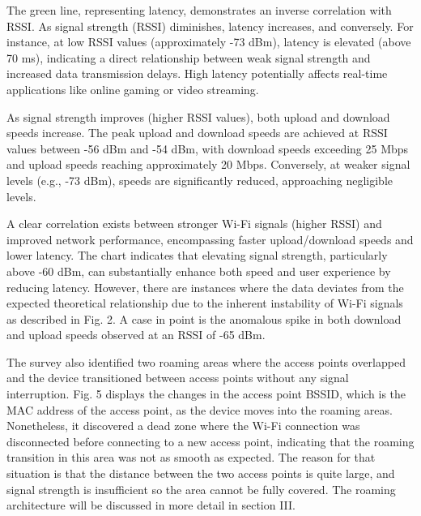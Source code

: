\documentclass[conference]{IEEEtran}
\begin{document}
The green line, representing latency, demonstrates an inverse correlation with RSSI. As signal strength (RSSI) diminishes, latency increases, and conversely. For instance, at low RSSI values (approximately -73 dBm), latency is elevated (above 70 ms), indicating a direct relationship between weak signal strength and increased data transmission delays. High latency potentially affects real-time applications like online gaming or video streaming.

As signal strength improves (higher RSSI values), both upload and download speeds increase. The peak upload and download speeds are achieved at RSSI values between -56 dBm and -54 dBm, with download speeds exceeding 25 Mbps and upload speeds reaching approximately 20 Mbps. Conversely, at weaker signal levels (e.g., -73 dBm), speeds are significantly reduced, approaching negligible levels. 

A clear correlation exists between stronger Wi-Fi signals (higher RSSI) and improved network performance, encompassing faster upload/download speeds and lower latency. The chart indicates that elevating signal strength, particularly above -60 dBm, can substantially enhance both speed and user experience by reducing latency. However, there are instances where the data deviates from the expected theoretical relationship due to the inherent instability of Wi-Fi signals as described in Fig. 2. A case in point is the anomalous spike in both download and upload speeds observed at an RSSI of -65 dBm.

The survey also identified two roaming areas where the access points overlapped and the device transitioned between access points without any signal interruption. Fig. 5 displays the changes in the access point BSSID, which is the MAC address of the access point, as the device moves into the roaming areas. Nonetheless, it discovered a dead zone where the Wi-Fi connection was disconnected before connecting to a new access point, indicating that the roaming transition in this area was not as smooth as expected. The reason for that situation is that the distance between the two access points is quite large, and signal strength is insufficient so the area cannot be fully covered. The roaming architecture will be discussed in more detail in section III.
\end{document}
